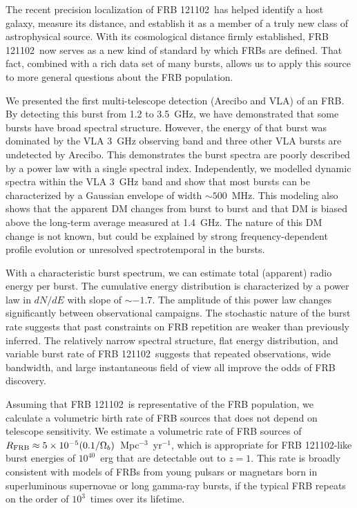 \documentclass[twocolumn]{aastex61}
\newcommand{\frb}{FRB 121102}
\begin{document}
The recent precision localization of \frb\ has helped identify a host galaxy, measure its distance, and establish it as a member of a truly new class of astrophysical source. With its cosmological distance firmly established, \frb\ now serves as a new kind of standard by which FRBs are defined. That fact, combined with a rich data set of many bursts, allows us to apply this source to more general questions about the FRB population.

We presented the first multi-telescope detection (Arecibo and VLA) of an FRB. By detecting this burst from 1.2 to 3.5~GHz, we have demonstrated that some bursts have broad spectral structure. However, the energy of that burst was dominated by the VLA 3~GHz observing band and three other VLA bursts are undetected by Arecibo. This demonstrates the burst spectra are poorly described by a power law with a single spectral index. Independently, we modelled dynamic spectra within the VLA 3~GHz band and show that most bursts can be characterized by a Gaussian envelope of width $\sim500$\ MHz. This modeling also shows that the apparent DM changes from burst to burst and that DM is biased above the long-term average measured at 1.4~GHz. The nature of this DM change is not known, but could be explained by strong frequency-dependent profile evolution or unresolved spectrotemporal in the bursts.

With a characteristic burst spectrum, we can estimate total (apparent) radio energy per burst. The cumulative energy distribution is characterized by a power law in $dN/dE$ with slope of $\sim-1.7$. The amplitude of this power law changes significantly between observational campaigns. The stochastic nature of the burst rate suggests that past constraints on FRB repetition are weaker than previously inferred. The relatively narrow spectral structure, flat energy distribution, and variable burst rate of \frb\ suggests that repeated observations, wide bandwidth, and large instantaneous field of view all improve the odds of FRB discovery.

Assuming that \frb\ is representative of the FRB population, we calculate a volumetric birth rate of FRB sources that does not depend on telescope sensitivity. We estimate a volumetric rate of FRB sources of $R_{\rm{FRB}} \approx 5\times10^{-5} (0.1/\Omega_b)$\ Mpc$^{-3}$\ yr$^{-1}$, which is appropriate for \frb-like burst energies of $10^{40}$\ erg that are detectable out to $z=1$. This rate is broadly consistent with models of FRBs from young pulsars or magnetars born in superluminous supernovae or long gamma-ray bursts, if the typical FRB repeats on the order of $10^3$\ times over its lifetime.
\end{document}
